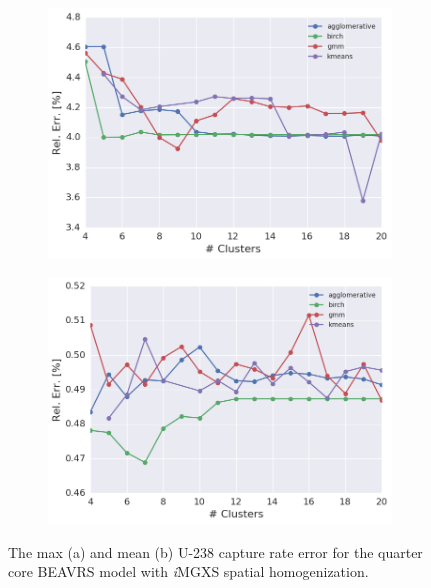\begin{figure}[h!]
\centering
\begin{subfigure}{0.9\textwidth}
  \centering
  \includegraphics[width=\linewidth]{figures/results/err-by-cluster/full-core/max-rel-err}
  \caption{}
  \label{fig:max-capt-err-by-cluster-full-core}
\end{subfigure}
\begin{subfigure}{0.9\textwidth}
  \centering
  \includegraphics[width=\linewidth]{figures/results/err-by-cluster/full-core/mean-rel-err}
  \caption{}
  \label{fig:mean-capt-err-by-cluster-full-core}
\end{subfigure}
\caption[U-238 capture error for quarter core BEAVRS model]{The max (a) and mean (b) U-238 capture rate error for the quarter core \ac{BEAVRS} model with \textit{i}\ac{MGXS} spatial homogenization.}
\label{fig:capt-err-by-cluster-full-core}
\end{figure}

